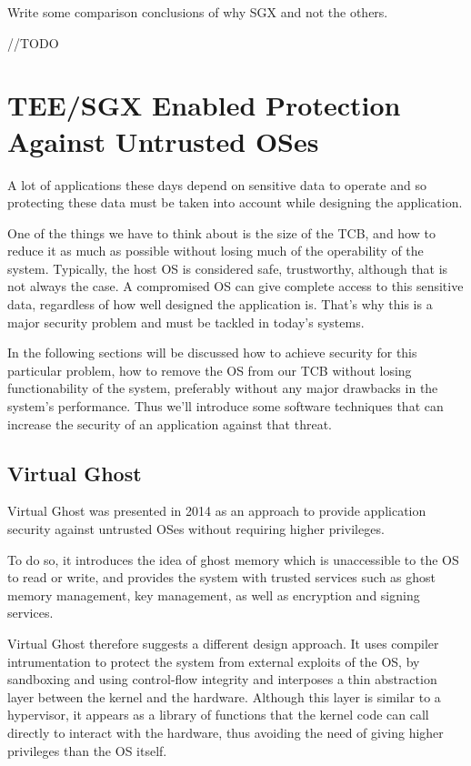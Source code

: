Write some comparison conclusions of why SGX and not the others.

//TODO



\section{TEE/SGX Enabled Protection Against Untrusted OSes} %
\label{sec:folder_structure}

A lot of applications these days depend on sensitive data to operate and so protecting these data must be taken into account while designing the application. 

One of the things we have to think about is the size of the TCB, and how to reduce it as much as possible without losing much of the operability of the system. Typically, the host OS is considered safe, trustworthy, although that is not always the case. A compromised OS can give complete access to this sensitive data, regardless of how well designed the application is. That's why this is a major security problem and must be tackled in today's systems. 

In the following sections will be discussed how to achieve security for this particular problem, how to remove the OS from our TCB without losing functionability of the system, preferably without any major drawbacks in the system's performance. Thus we'll introduce some software techniques that can increase the security of an application against that threat.

\subsection{Virtual Ghost}

Virtual Ghost was presented in 2014 \cite{virtGhostPaper} as an approach to provide application security against untrusted OSes without requiring higher privileges. 

To do so, it introduces the idea of ghost memory which is unaccessible to the OS to read or write, and provides the system with trusted services such as ghost memory management, key management, as well as encryption and signing services. 

Virtual Ghost therefore suggests a different design approach.
It uses compiler intrumentation to protect the system from external exploits of the OS, by sandboxing and using control-flow integrity and interposes a thin abstraction layer between the kernel and the hardware. Although this layer is similar to a hypervisor, it appears as a library of functions that the kernel code can call directly to interact with the hardware, thus avoiding the need of giving higher privileges than the OS itself. 

